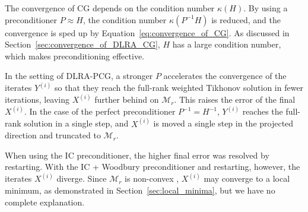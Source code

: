 The convergence of CG depends on the condition number $\kappa(H)$. By using a preconditioner $P \approx H$, the condition number $\kappa(P^{-1} H)$ is reduced, and the convergence is sped up by Equation~\eqref{eq:convergence_of_CG}. As discussed in Section~\ref{sec:convergence_of_DLRA_CG}, $H$ has a large condition number, which makes preconditioning effective.

In the setting of DLRA-PCG, a stronger $P$ accelerates the convergence of the iterates $Y^{(i)}$ so that they reach the full-rank weighted Tikhonov solution in fewer iterations, leaving $X^{(i)}$ further behind on $\mathcal{M}_r$. This raises the error of the final $X^{(i)}$. In the case of the perfect preconditioner $P^{-1} = H^{-1}$, $Y^{(i)}$ reaches the full-rank solution in a single step, and $X^{(i)}$ is moved a single step in the projected direction and truncated to $\mathcal{M}_r$.

When using the IC preconditioner, the higher final error was resolved by restarting. With the IC + Woodbury preconditioner and restarting, however, the iterates $X^{(i)}$ diverge. Since $\mathcal{M}_r$ is non-convex \cite{absilOptimizationAlgorithmsMatrix2008}, $X^{(i)}$ may converge to a local minimum, as demonstrated in Section~\ref{sec:local_minima}, but we have no complete explanation.
